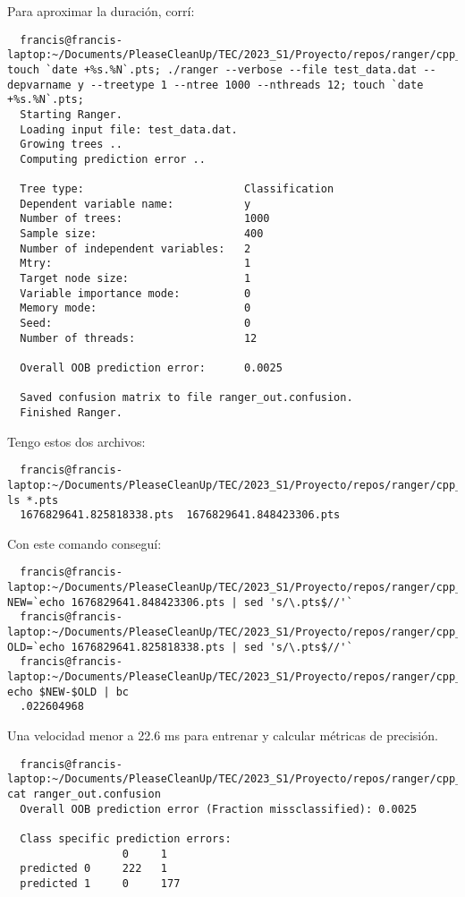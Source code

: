 \documentclass[12pt,oneside]{book}
\begin{document}
Para aproximar la duración, corrí:
\begin{lstlisting}
  francis@francis-laptop:~/Documents/PleaseCleanUp/TEC/2023_S1/Proyecto/repos/ranger/cpp_version/build$ touch `date +%s.%N`.pts; ./ranger --verbose --file test_data.dat --depvarname y --treetype 1 --ntree 1000 --nthreads 12; touch `date +%s.%N`.pts;
  Starting Ranger.
  Loading input file: test_data.dat.
  Growing trees ..
  Computing prediction error ..
  
  Tree type:                         Classification
  Dependent variable name:           y
  Number of trees:                   1000
  Sample size:                       400
  Number of independent variables:   2
  Mtry:                              1
  Target node size:                  1
  Variable importance mode:          0
  Memory mode:                       0
  Seed:                              0
  Number of threads:                 12
  
  Overall OOB prediction error:      0.0025
  
  Saved confusion matrix to file ranger_out.confusion.
  Finished Ranger. \end{lstlisting}

Tengo estos dos archivos:

\begin{lstlisting}
  francis@francis-laptop:~/Documents/PleaseCleanUp/TEC/2023_S1/Proyecto/repos/ranger/cpp_version/build$ ls *.pts
  1676829641.825818338.pts  1676829641.848423306.pts \end{lstlisting}

Con este comando conseguí:
\begin{lstlisting}
  francis@francis-laptop:~/Documents/PleaseCleanUp/TEC/2023_S1/Proyecto/repos/ranger/cpp_version/build$ NEW=`echo 1676829641.848423306.pts | sed 's/\.pts$//'`
  francis@francis-laptop:~/Documents/PleaseCleanUp/TEC/2023_S1/Proyecto/repos/ranger/cpp_version/build$ OLD=`echo 1676829641.825818338.pts | sed 's/\.pts$//'`
  francis@francis-laptop:~/Documents/PleaseCleanUp/TEC/2023_S1/Proyecto/repos/ranger/cpp_version/build$ echo $NEW-$OLD | bc
  .022604968 \end{lstlisting}

Una velocidad menor a 22.6 ms para entrenar y calcular métricas de precisión.

\begin{lstlisting}
  francis@francis-laptop:~/Documents/PleaseCleanUp/TEC/2023_S1/Proyecto/repos/ranger/cpp_version/build$ cat ranger_out.confusion 
  Overall OOB prediction error (Fraction missclassified): 0.0025
  
  Class specific prediction errors:
                  0     1
  predicted 0     222   1     
  predicted 1     0     177 \end{lstlisting}
\end{document}
